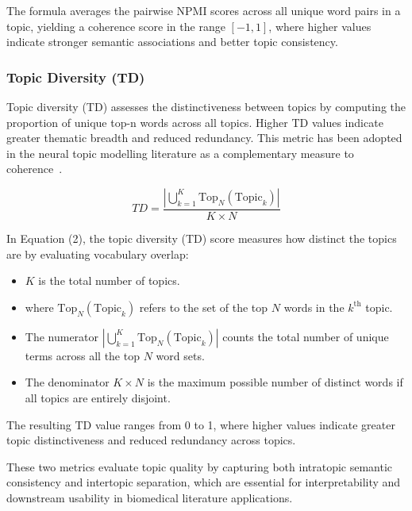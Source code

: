 \documentclass{ieeeaccess}
\begin{document}
The formula averages the pairwise NPMI scores across all unique word pairs in a topic, yielding a coherence score in the range $[-1, 1]$, where higher values indicate stronger semantic associations and better topic consistency.

\subsubsection{Topic Diversity (TD)}

Topic diversity (TD) assesses the distinctiveness between topics by computing the proportion of unique top-n words across all topics. Higher TD values indicate greater thematic breadth and reduced redundancy. This metric has been adopted in the neural topic modelling literature as a complementary measure to coherence~\cite{dieng_topic_2020}.

\begin{equation}
TD = \frac{\left|\bigcup_{k=1}^{K} \text{Top}_N(\text{Topic}_k)\right|}{K \times N}
\end{equation}

In Equation (2), the topic diversity (TD) score measures how distinct the topics are by evaluating vocabulary overlap:

\begin{itemize}
    \item $K$ is the total number of topics.
    
    \item where $\text{Top}_N(\text{Topic}_k)$ refers to the set of the top $N$ words in the $k^{\text{th}}$ topic.
    
    \item The numerator $\left|\bigcup_{k=1}^{K} \text{Top}_N(\text{Topic}_k)\right|$ counts the total number of unique terms across all the top $N$ word sets.
    
    \item The denominator $K \times N$ is the maximum possible number of distinct words if all topics are entirely disjoint.
\end{itemize}

The resulting TD value ranges from 0 to 1, where higher values indicate greater topic distinctiveness and reduced redundancy across topics.

These two metrics evaluate topic quality by capturing both intratopic semantic consistency and intertopic separation, which are essential for interpretability and downstream usability in biomedical literature applications.
\end{document}
